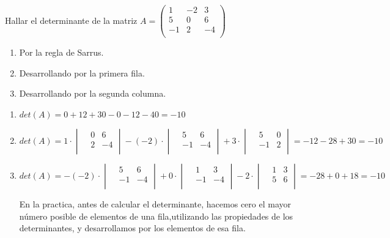 \begin{ejemplo}
Hallar el determinante de la matriz $A=\begin{pmatrix} 
 1& -2& 3 \\
 5& 0& 6 \\
 -1& 2& -4 \\
\end{pmatrix} $
\begin{enumerate}[label=\alph* )]
\item Por la regla de Sarrus.
\item Desarrollando por la primera fila.
\item Desarrollando por la segunda columna.
\end{enumerate}

\tcblower
\begin{enumerate}[label=\alph* )]
\item $det(A)= 0+12+30-0-12-40=-10$
\item $det(A)=1\cdot \begin{vmatrix}& 0& 6 \\& 2& -4 \\ \end{vmatrix} -(-2)\cdot \begin{vmatrix}& 5& 6 \\& -1& -4 \\ \end{vmatrix} +3\cdot \begin{vmatrix}& 5& 0 \\& -1& 2 \\ \end{vmatrix}= -12-28+30=-10$
\item $det(A)=-(-2)\cdot \begin{vmatrix}& 5& 6 \\& -1& -4 \\ \end{vmatrix} +0\cdot \begin{vmatrix}& 1& 3 \\& -1& -4 \\ \end{vmatrix} -2\cdot \begin{vmatrix}& 1& 3 \\& 5& 6 \\ \end{vmatrix}= -28+0+18=-10$

En la practica, antes de calcular el determinante, hacemos cero el mayor número posible de elementos de una fila,utilizando las propiedades de los determinantes, y desarrollamos por los elementos de esa fila.

\end{enumerate}

\end{ejemplo}

